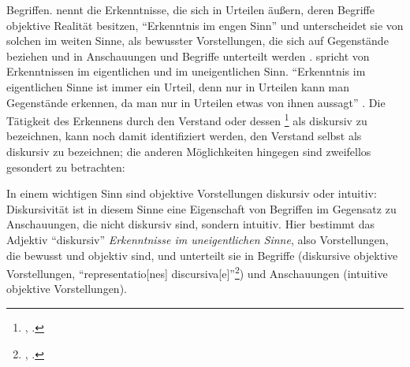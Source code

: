 \begin{nummerierung}
{Begriffen.  nennt die Erkenntnisse,
die sich in Urteilen äußern, deren Begriffe objektive Realität besitzen, \enquote{Erkenntnis im engen Sinn} und unterscheidet sie von
solchen im weiten Sinne, als bewusster Vorstellungen, die sich auf Gegenstände
beziehen und in Anschauungen und Begriffe unterteilt werden
\parencite[vgl.][29]{Gruene:BlindeAnschauung2009}.
 spricht von Erkenntnissen im
eigentlichen und im uneigentlichen Sinn. \enquote{Erkenntnis im eigentlichen
Sinne ist immer ein Urteil, denn nur in Urteilen kann man Gegenstände erkennen,
da man nur in Urteilen etwas von ihnen aussagt}
\parencite[][7]{Prien:KantsLogikderBegriffe2006}.} Die Tätigkeit des Erkennens
durch den Verstand oder dessen \footnote{\cite[][B
283]{Kant:KritikderreinenVernunft2003}, \cite[][III:
195.37--196.1]{Kant:GesammelteWerke1900ff.}.} als diskursiv zu bezeichnen, kann
noch damit identifiziert werden, den Verstand selbst als diskursiv zu
bezeichnen; die anderen Möglichkeiten hingegen sind zweifellos gesondert zu betrachten:

\item In einem wichtigen Sinn sind objektive Vorstellungen diskursiv oder
intuitiv: Diskursivität ist in diesem Sinne eine Eigenschaft von Begriffen im
Gegensatz zu Anschauungen, die nicht diskursiv sind, sondern intuitiv. Hier bestimmt das
Adjektiv \enquote{diskursiv} \emph{Erkenntnisse im uneigentlichen
Sinne}, also Vorstellungen, die
bewusst und objektiv sind, und unterteilt sie in Begriffe (diskursive objektive
Vorstellungen, \enquote{representatio[nes]
discursiva[e]}\footnote{\cite[][\S~1]{Kant:ImmanuelKantsLogik1977}, \cite[][IX:
91.10]{Kant:GesammelteWerke1900ff.}.}) und Anschauungen (intuitive objektive
Vorstellungen).


\end{nummerierung}

